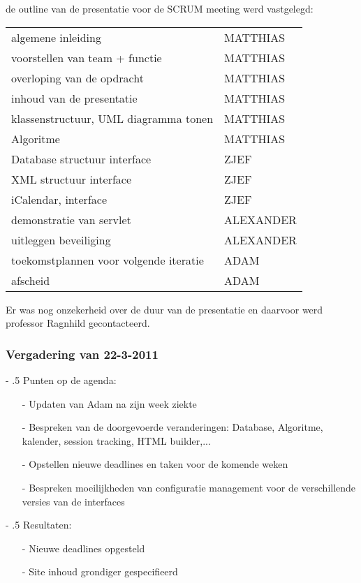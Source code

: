 \documentclass{article}
\makeatletter
\renewcommand\paragraph{%
   \@startsection{paragraph}{4}{0mm}%
      {-\baselineskip}%
      {.5\baselineskip}%
      {\normalfont\normalsize\bfseries}}
\makeatother
\begin{document}
de outline van de presentatie voor de SCRUM meeting werd vastgelegd:
\begin{center}
\begin{tabular}{ll}
algemene inleiding &	MATTHIAS \\
voorstellen van team + functie &	MATTHIAS \\
overloping van de opdracht &	MATTHIAS \\
inhoud van de presentatie &	MATTHIAS \\
klassenstructuur, UML diagramma tonen &	MATTHIAS \\
Algoritme & MATTHIAS \\
Database structuur interface &	ZJEF \\
XML structuur interface &	ZJEF \\
iCalendar, interface &	ZJEF \\
demonstratie van servlet &	ALEXANDER \\
uitleggen beveiliging &	ALEXANDER \\
toekomstplannen	voor volgende iteratie &	ADAM \\
afscheid & 	ADAM \\
\end{tabular}
\end{center}
Er was nog onzekerheid over de duur van de presentatie en daarvoor werd professor Ragnhild gecontacteerd. 

\newpage
\subsubsection{Vergadering van 22-3-2011}
\paragraph{Punten op de agenda:}
\begin{itemize}
	\item[-] Updaten van Adam na zijn week ziekte 
	\item[-] Bespreken van de doorgevoerde veranderingen: Database, Algoritme, kalender, session tracking, HTML builder,... 
	\item[-] Opstellen nieuwe deadlines en taken voor de komende weken
	\item[-] Bespreken moeilijkheden van configuratie management voor de verschillende versies van de interfaces 
\end{itemize}
\paragraph{Resultaten:}
\begin{itemize}
	\item[-] Nieuwe deadlines opgesteld
	\item[-] Site inhoud grondiger gespecifieerd
\end{itemize}
\end{document}
